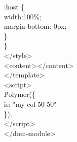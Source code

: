\documentclass{article}
\begin{document}
{{\hspace*{1.8cm}:host \{\\
\hspace*{2.4cm}width:100\%;\\
\hspace*{2.4cm}margin-bottom: 0px;\\
\hspace*{1.8cm}\}\\
\hspace*{1.2cm}\}\\
\hspace*{1.2cm}</style>	\\
\hspace*{1.2cm}<content></content>\\
\hspace*{0.6cm}</template>\\
\hspace*{0.6cm}<script>\\
\hspace*{1.2cm}Polymer(\{\\
\hspace*{1.8cm}is: "my-col-50-50"\\
\hspace*{1.2cm}\});\\
\hspace*{0.6cm}</script>\\
</dom-module>
}}
\end{document}
